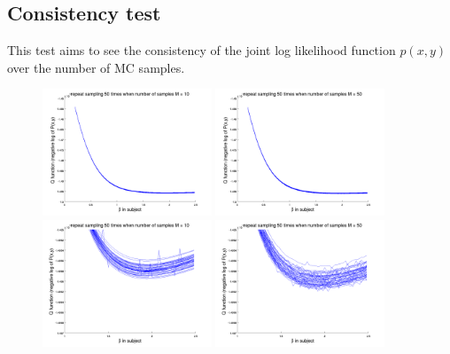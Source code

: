 \documentclass[12pt]{article}
\begin{document}
\subsection{Consistency test}
This test aims to see the consistency of the joint log likelihood function $p(x,y)$ over the number of MC samples. 
\begin{figure}
  \includegraphics[width=0.45\textwidth]{figures/n10}
  \includegraphics[width=0.45\textwidth]{figures/n50}\\
  \includegraphics[width=0.45\textwidth]{figures/n10_zoom}
  \includegraphics[width=0.45\textwidth]{figures/n50_zoom}
\end{figure}
\end{document}
